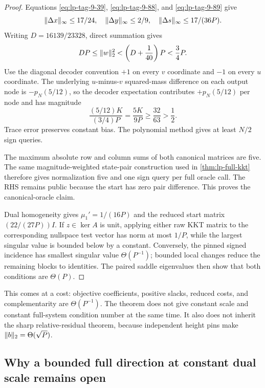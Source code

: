 \begin{proof}
Equations \eqref{eq:lp-tag-9-39}, \eqref{eq:lp-tag-9-88}, and
\eqref{eq:lp-tag-9-89} give
\[
 \lVert\Delta x\rVert_\infty\leq17/24,
 \quad \lVert\Delta y\rVert_\infty\leq2/9,
 \quad \lVert\Delta s\rVert_\infty\leq17/(36P).
\]
Writing \(D=16139/23328\), direct summation gives
\begin{equation}
 DP\leq\lVert w\rVert_2^2<\left(D+\frac1{40}\right)P<\frac34P.
\end{equation}
Use the diagonal decoder convention \(+1\) on every \(v\) coordinate and
\(-1\) on every \(u\) coordinate.  The underlying \(u\)-minus-\(v\)
squared-mass difference on each output node is \(-p_N(5/12)\), so the
decoder expectation contributes \(+p_N(5/12)\) per node and has magnitude
\begin{equation}
 \frac{(5/12)K}{(3/4)P}=\frac{5K}{9P}
 \geq\frac{32}{63}>\frac12.
\end{equation}
Trace error preserves constant bias.  The polynomial method gives at least
\(N/2\) sign queries.

The maximum absolute row and column sums of both canonical matrices are five.
The same magnitude-weighted state-pair construction used in
\cref{thm:lp-full-kkt} therefore gives normalization five and one
sign query per full oracle call.  The RHS remains public because the start
has zero pair difference.  This proves the canonical-oracle claim.

Dual homogeneity gives \(\mu_1'=1/(16P)\) and the reduced start matrix
\((22/(27P))I\).  If \(z\in\ker A\) is unit, applying either raw KKT matrix
to the corresponding nullspace test vector has norm at most \(1/P\), while
the largest singular value is bounded below by a constant.  Conversely, the
pinned signed incidence has smallest singular value \(\Theta(P^{-1})\);
bounded local changes reduce the remaining blocks to identities.  The paired
saddle eigenvalues then show that both conditions are \(\Theta(P)\).
\end{proof}

This comes at a cost: objective coefficients, positive slacks, reduced costs,
and complementarity are \(\Theta(P^{-1})\).  The theorem does not give
constant scale and constant full-system condition number at the same time.  It also does not inherit
the sharp relative-residual theorem, because independent height pins make
\(\lVert b\rVert_2=\Theta(\sqrt P)\).

\subsection{Why a bounded full direction at constant dual scale remains open}
\label{sec:lp-beyond-pairs}

